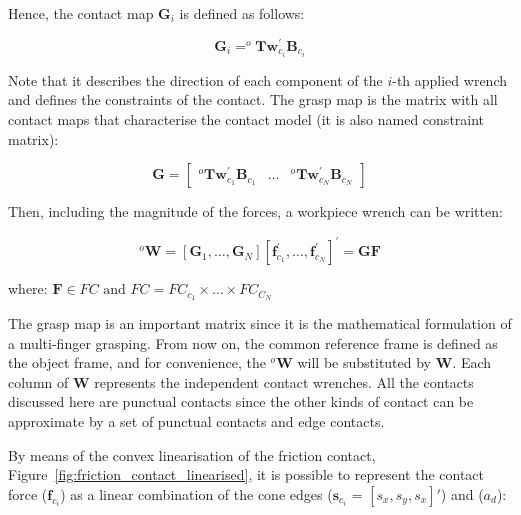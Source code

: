 Hence, the contact map $\mathbf{G}_{i}$ is defined as follows:

\begin{equation}
\mathbf{G}_{i}=^{o} \mathbf{T} \mathbf{w}_{c_i}^{\prime} \mathbf{B}_{c_i}
\end{equation}

Note that it describes the direction of each component of the $i$-th applied wrench and defines the constraints of the contact. The grasp map is the matrix with all contact maps that characterise the contact model (it is also named constraint matrix):

\begin{equation}
\mathbf{G}=\left[\begin{array}{llll}
{{}^o \mathbf{T} \mathbf{w}_{c_1}^{\prime} \mathbf{B}_{c_1}} & {\dots} & {{}^{o} \mathbf{T} \mathbf{w}_{c_N}^{\prime} \mathbf{B}_{c_N}}
\end{array}\right]
\end{equation}

Then, including the magnitude of the forces, a workpiece wrench can be written:

\begin{equation}
^{o} \mathbf{W}=\left[\mathbf{G}_{1}, \ldots, \mathbf{G}_{N}\right]\left[\mathbf{f}_{c_1}^{\prime}, \ldots, \mathbf{f}_{c_N}^{\prime}\right]^{\prime}=\mathbf{G} \mathbf{F}
\end{equation}

\noindent
where: $\mathbf{F} \in F C \text { and } F C=F C_{c_1} \times \ldots \times F C_{C_N}$

The grasp map is an important matrix since it is the mathematical formulation of a multi-finger grasping. From now on, the common reference frame is defined as the object frame, and for convenience, the $^{o}\mathbf{W}$ will be substituted by $\mathbf{W}$. Each column of $\mathbf{W}$ represents the independent contact wrenches. All the contacts discussed here are punctual contacts since the other kinds of contact can be approximate by a set of punctual contacts and edge contacts.

By means of the convex linearisation of the friction contact, Figure~\ref{fig:friction_contact_linearised}, it is possible to represent the contact force ($\mathbf{f}_{c_i}$) as a linear combination of the cone edges ($\mathbf{s}_{c_i}$ = $[s_x,s_y,s_x]'$) and ($a_d$):

